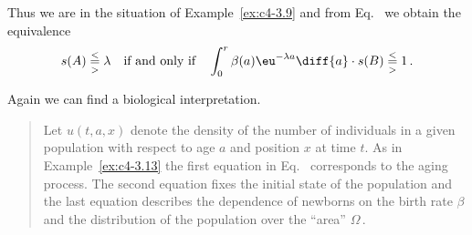 \begin{example}
Thus we are in the situation of Example~\ref{ex:c4-3.9} and from Eq.~ we obtain the equivalence
\[
s(A) \overset{<}{ \underset{>}{=} } \lambda \quad \text{if and only if} \quad \int_{0}^{r} \beta(a)\eu^{-\lambda a} \diff{a} \cdot s(B) \overset{<}{ \underset{>}{=} } 1\,.
\]
\end{example}
Again we can find a biological interpretation.
\begin{quote}
Let $u(t,a,x)$ denote the density of the number of individuals in a given population with respect to age $a$ and position $x$ at time $t$.
As in Example~\ref{ex:c4-3.13} the first equation in Eq.~ corresponds to the aging process.
The second equation fixes the initial state of the population and the last equation describes the dependence of newborns on the birth rate $\beta$ and the distribution of the population over the \enquote{area} $\Omega$\,.
\end{quote}
